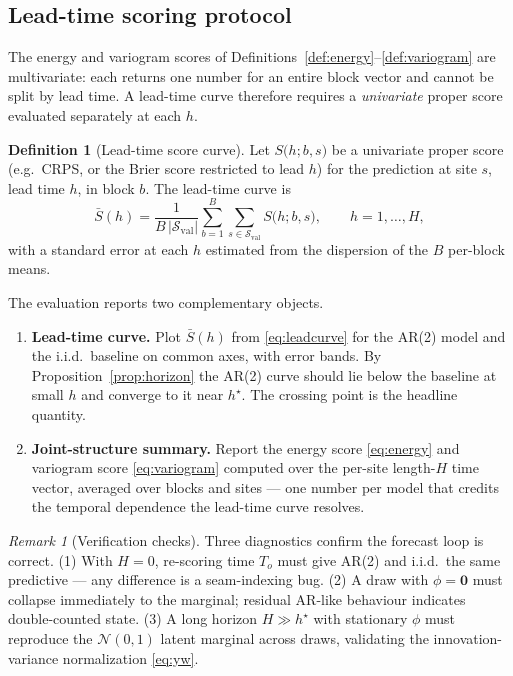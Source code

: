 \documentclass[11pt]{article}
\theoremstyle{definition}
\newtheorem{definition}{Definition}
\theoremstyle{remark}
\newtheorem{remark}{Remark}
\newcommand{\Norm}{\mathcal{N}}
\begin{document}
\subsection{Lead-time scoring protocol}

The energy and variogram scores of
Definitions~\ref{def:energy}--\ref{def:variogram} are multivariate:
each returns one number for an entire block vector and cannot be split
by lead time. A lead-time curve therefore requires a \emph{univariate}
proper score evaluated separately at each $h$.

\begin{definition}[Lead-time score curve]
\label{def:leadcurve}
Let $S\big(h; b, s\big)$ be a univariate proper score (e.g.\ CRPS, or
the Brier score restricted to lead $h$) for the prediction at site $s$,
lead time $h$, in block $b$. The lead-time curve is
\begin{equation}
  \bar S(h)
  = \frac{1}{B\,|\mathcal{S}_{\text{val}}|}
    \sum_{b=1}^{B}
    \sum_{s\in\mathcal{S}_{\text{val}}}
    S\big(h; b, s\big),
  \qquad h = 1,\dots,H,
  \label{eq:leadcurve}
\end{equation}
with a standard error at each $h$ estimated from the dispersion of the
$B$ per-block means.
\end{definition}

The evaluation reports two complementary objects.
\begin{enumerate}[label=(\roman*)]
  \item \textbf{Lead-time curve.} Plot $\bar S(h)$ from
        \eqref{eq:leadcurve} for the AR(2) model and the i.i.d.\
        baseline on common axes, with error bands. By
        Proposition~\ref{prop:horizon} the AR(2) curve should lie below
        the baseline at small $h$ and converge to it near
        $h^\star$. The crossing point is the headline quantity.
  \item \textbf{Joint-structure summary.} Report the energy score
        \eqref{eq:energy} and variogram score \eqref{eq:variogram}
        computed over the per-site length-$H$ time vector, averaged
        over blocks and sites --- one number per model that credits the
        temporal dependence the lead-time curve resolves.
\end{enumerate}

\begin{remark}[Verification checks]
\label{rem:checks}
Three diagnostics confirm the forecast loop is correct.
(1) With $H=0$, re-scoring time $T_o$ must give AR(2) and i.i.d.\ the
same predictive --- any difference is a seam-indexing bug.
(2) A draw with $\phi=\bm 0$ must collapse immediately to the marginal;
residual AR-like behaviour indicates double-counted state.
(3) A long horizon $H\gg h^\star$ with stationary $\phi$ must reproduce
the $\Norm(0,1)$ latent marginal across draws, validating the
innovation-variance normalization \eqref{eq:yw}.
\end{remark}
\end{document}
